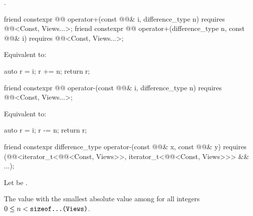 \begin{itemdescr}
\pnum
\returns
{}.
\end{itemdescr}

\begin{itemdecl}
friend constexpr @@ operator+(const @@& i, difference_type n)
  requires @@<Const, Views...>;
friend constexpr @@ operator+(difference_type n, const @@& i)
  requires @@<Const, Views...>;
\end{itemdecl}

\begin{itemdescr}
\pnum
\effects
Equivalent to:
\begin{codeblock}
auto r = i;
r += n;
return r;
\end{codeblock}
\end{itemdescr}

\begin{itemdecl}
friend constexpr @@ operator-(const @@& i, difference_type n)
  requires @@<Const, Views...>;
\end{itemdecl}

\begin{itemdescr}
\pnum
\effects
Equivalent to:
\begin{codeblock}
auto r = i;
r -= n;
return r;
\end{codeblock}
\end{itemdescr}

\begin{itemdecl}
friend constexpr difference_type operator-(const @@& x, const @@& y)
  requires (@@<iterator_t<@@<Const, Views>>,
                               iterator_t<@@<Const, Views>>> && ...);
\end{itemdecl}

\begin{itemdescr}
\pnum
Let  be .

\pnum
\returns
The value with the smallest absolute value among 
for all integers $0 \leq n < \texttt{\protect sizeof...(Views)}$.
\end{itemdescr}

